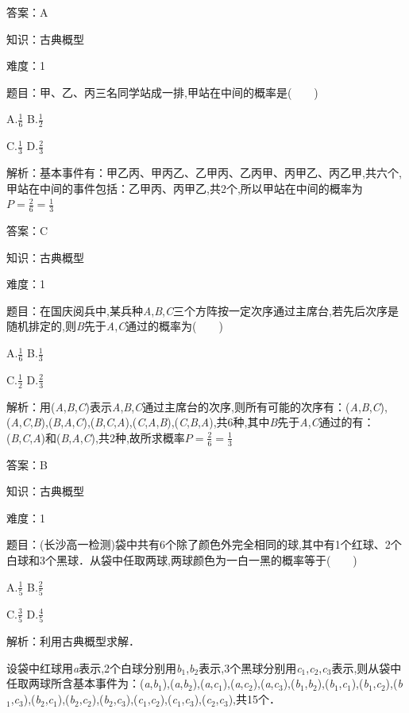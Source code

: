 \documentclass{article} %
\begin{document}
答案：A

知识：古典概型

难度：1

题目：甲、乙、丙三名同学站成一排,甲站在中间的概率是(　　)

A.$\frac{1}{6}$  B.$\frac{1}{2}$

C.$\frac{1}{3}$  D.$\frac{2}{3}$

解析：基本事件有：甲乙丙、甲丙乙、乙甲丙、乙丙甲、丙甲乙、丙乙甲,共六个,甲站在中间的事件包括：乙甲丙、丙甲乙,共2个,所以甲站在中间的概率为$P=\frac{2}{6}=\frac{1}{3}$

答案：C

知识：古典概型

难度：1

题目：在国庆阅兵中,某兵种\textit{A},\textit{B},\textit{C}三个方阵按一定次序通过主席台,若先后次序是随机排定的,则\textit{B}先于\textit{A},\textit{C}通过的概率为(　　)

A.$\frac{1}{6}$  B.$\frac{1}{3}$

C.$\frac{1}{2}$  D.$\frac{2}{3}$

解析：用(\textit{A},\textit{B},\textit{C})表示\textit{A},\textit{B},\textit{C}通过主席台的次序,则所有可能的次序有：(\textit{A},\textit{B},\textit{C}),(\textit{A},\textit{C},\textit{B}),(\textit{B},\textit{A},\textit{C}),(\textit{B},\textit{C},\textit{A}),(\textit{C},\textit{A},\textit{B}),(\textit{C},\textit{B},\textit{A}),共6种,其中\textit{B}先于\textit{A},\textit{C}通过的有：(\textit{B},\textit{C},\textit{A})和(\textit{B},\textit{A},\textit{C}),共2种,故所求概率$P=\frac{2}{6}=\frac{1}{3}$

答案：B

知识：古典概型

难度：1

题目：(长沙高一检测)袋中共有6个除了颜色外完全相同的球,其中有1个红球、2个白球和3个黑球．从袋中任取两球,两球颜色为一白一黑的概率等于(　　)

A.$\frac{1}{5}$  B.$\frac{2}{5}$

C.$\frac{3}{5}$  D.$\frac{4}{5}$

解析：利用古典概型求解．

设袋中红球用\textit{a}表示,2个白球分别用\textit{b}${}_{1}$,\textit{b}${}_{2}$表示,3个黑球分别用\textit{c}${}_{1}$,\textit{c}${}_{2}$,\textit{c}${}_{3}$表示,则从袋中任取两球所含基本事件为：(\textit{a},\textit{b}${}_{1}$),(\textit{a},\textit{b}${}_{2}$),(\textit{a},\textit{c}${}_{1}$),(\textit{a},\textit{c}${}_{2}$),(\textit{a},\textit{c}${}_{3}$),(\textit{b}${}_{1}$,\textit{b}${}_{2}$),(\textit{b}${}_{1}$,\textit{c}${}_{1}$),(\textit{b}${}_{1}$,\textit{c}${}_{2}$),(\textit{b}${}_{1}$,\textit{c}${}_{3}$),(\textit{b}${}_{2}$,\textit{c}${}_{1}$),(\textit{b}${}_{2}$,\textit{c}${}_{2}$),(\textit{b}${}_{2}$,\textit{c}${}_{3}$),(\textit{c}${}_{1}$,\textit{c}${}_{2}$),(\textit{c}${}_{1}$,\textit{c}${}_{3}$),(\textit{c}${}_{2}$,\textit{c}${}_{3}$),共15个．
\end{document}
